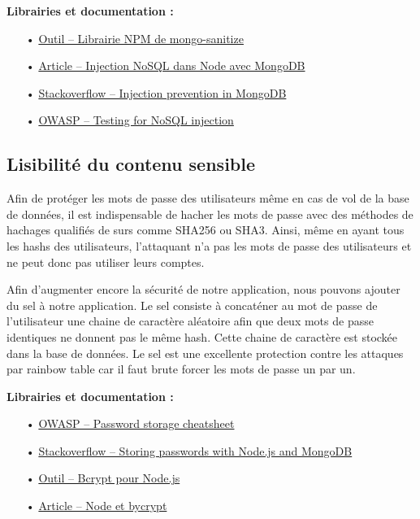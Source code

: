 \documentclass[12pt]{article}
\begin{document}
\medskip
\textbf{Librairies et documentation :}

\begin{itemize}
\item[•] \href{https://www.npmjs.com/package/mongo-sanitize}{Outil -- Librairie NPM de mongo-sanitize}
\item[•] \href{https://zanon.io/posts/nosql-injection-in-mongodb}{Article -- Injection NoSQL dans Node avec MongoDB}
\item[•] \href{https://stackoverflow.com/questions/13436467/javascript-nosql-injection-prevention-in-mongodb}{Stackoverflow -- Injection prevention in MongoDB}
\item[•] \href{https://www.owasp.org/index.php/Testing_for_NoSQL_injection}{OWASP -- Testing for NoSQL injection}
\end{itemize}

\subsection{Lisibilité du contenu sensible}
\label{ssec:cm-hash}

Afin de protéger les mots de passe des utilisateurs même en cas de vol de la base de données, il est indispensable de hacher les mots de passe avec des méthodes de hachages qualifiés de surs comme SHA256 ou SHA3. Ainsi, même en ayant tous les hashs des utilisateurs, l'attaquant n'a pas les mots de passe des utilisateurs et ne peut donc pas utiliser leurs comptes.

Afin d'augmenter encore la sécurité de notre application, nous pouvons ajouter du sel à notre application. Le sel consiste à concaténer au mot de passe de l'utilisateur une chaine de caractère aléatoire afin que deux mots de passe identiques ne donnent pas le même hash. Cette chaine de caractère est stockée dans la base de données. Le sel est une excellente protection contre les attaques par rainbow table car il faut brute forcer les mots de passe un par un.
\clearpage

\medskip
\textbf{Librairies et documentation :}

\begin{itemize}
\item[•] \href{https://www.owasp.org/index.php/Password_Storage_Cheat_Sheet}{OWASP -- Password storage cheatsheet}
\item[•] \href{https://stackoverflow.com/questions/6951563/storing-passwords-with-node-js-and-mongodb}{Stackoverflow -- Storing passwords with Node.js and MongoDB}
\item[•] \href{https://github.com/kelektiv/node.bcrypt.js}{Outil -- Bcrypt pour Node.js}
\item[•] \href{https://www.abeautifulsite.net/hashing-passwords-with-nodejs-and-bcrypt}{Article -- Node et bycrypt}
\end{itemize}
\end{document}
